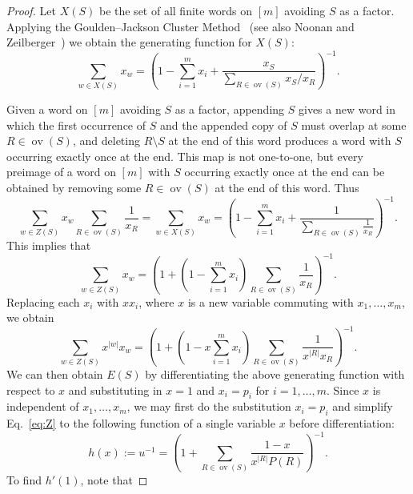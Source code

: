 \documentclass[10pt]{amsart}
\theoremstyle{definition}
\theoremstyle{remark}
\DeclareMathOperator{\overlap}{ov}
\begin{document}
\begin{proof}
Let $X(S)$ be the set of all finite words on $[m]$ avoiding $S$ as a factor.
Applying the Goulden--Jackson Cluster Method~\cite{GJ1, GJ2} (see also Noonan and Zeilberger~\cite{GJ3}) we obtain the generating function for $X(S)$:
\[ 
\sum_{w\in X(S)} x_w
= \left( 1 - \sum_{i=1}^m x_i + \frac{x_S} {\sum_{R\in\overlap(S)} x_S/x_R } \right)^{-1}.
\]

Given a word on $[m]$ avoiding $S$ as a factor, appending $S$ gives a new word in which the first occurrence of $S$ and the appended copy of $S$ must overlap at some $R\in\overlap(S)$, and deleting $R\setminus S$ at the end of this word produces a word with $S$ occurring exactly once at the end.
This map is not one-to-one, but every preimage of a word on $[m]$ with $S$ occurring exactly once at the end can be obtained by removing some $R\in\overlap(S)$ at the end of this word. %
Thus
\[ 
\sum_{w\in Z(S)} x_w \sum_{R\in\overlap(S)} \frac{1}{x_R} = \sum_{w\in X(S)} x_w
= \left( 1 - \sum_{i=1}^m x_i + \frac{1}{\sum_{R\in\overlap(S)} \frac1{x_R}} \right)^{-1}.
\]
This implies that
\[ 
\sum_{w\in Z(S)} x_w
= \left( 1 + \left(1 - \sum_{i=1}^m x_i\right) \sum_{R\in\overlap(S)} \frac1{x_R} \right)^{-1}.
\]
Replacing each $x_i$ with $x x_i$, where $x$ is a new variable commuting with $x_1,\ldots, x_m$, we obtain
\begin{equation}\label{eq:Z} 
\sum_{w\in Z(S)} x^{|w|} x_w
= \left( 1 + \left(1 - x\sum_{i=1}^m x_i\right) \sum_{R\in\overlap(S)} \frac{1}{x^{|R|} x_R} \right)^{-1}.
\end{equation}
We can then obtain $E(S)$ by differentiating the above generating function with respect to $x$ and substituting in $x=1$ and $x_i=p_i$ for $i=1,\ldots,m$.
Since $x$ is independent of $x_1, \ldots, x_m$, we may first do the substitution $x_i=p_i$ and simplify Eq.~\eqref{eq:Z} to the following function of a single variable $x$ before differentiation:
\begin{equation}\label{eq:h}
h(x) := u^{-1} = \left( 1 + \sum_{R\in\overlap(S)} \frac{1-x}{x^{|R|} P(R)} \right)^{-1}.
\end{equation}
To find $h'(1)$, note that

\end{proof}
\end{document}
